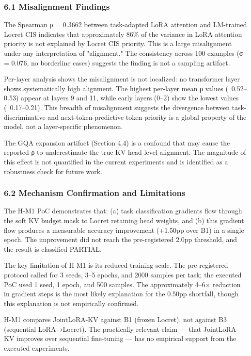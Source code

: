 
\subsubsection{6.1 Misalignment Findings}

The Spearman ρ = 0.3662 between task-adapted LoRA attention and LM-trained Locret CIS indicates that approximately 86\% of the variance in LoRA attention priority is not explained by Locret CIS priority. This is a large misalignment under any interpretation of "alignment." The consistency across 100 examples (σ = 0.076, no borderline cases) suggests the finding is not a sampling artifact.

Per-layer analysis shows the misalignment is not localized: no transformer layer shows systematically high alignment. The highest per-layer mean ρ values (~0.52–0.53) appear at layers 9 and 11, while early layers (0–2) show the lowest values (~0.17–0.21). This breadth of misalignment suggests the divergence between task-discriminative and next-token-predictive token priority is a global property of the model, not a layer-specific phenomenon.

The GQA expansion artifact (Section 4.4) is a confound that may cause the reported ρ to underestimate the true KV-head-level alignment. The magnitude of this effect is not quantified in the current experiments and is identified as a robustness check for future work.

\subsubsection{6.2 Mechanism Confirmation and Limitations}

The H-M1 PoC demonstrates that: (a) task classification gradients flow through the soft KV budget mask to Locret retaining head weights, and (b) this gradient flow produces a measurable accuracy improvement (+1.50pp over B1) in a single epoch. The improvement did not reach the pre-registered 2.0pp threshold, and the result is classified PARTIAL.

The key limitation of H-M1 is its reduced training scale. The pre-registered protocol called for 3 seeds, 3–5 epochs, and 2000 samples per task; the executed PoC used 1 seed, 1 epoch, and 500 samples. The approximately 4–6× reduction in gradient steps is the most likely explanation for the 0.50pp shortfall, though this explanation is not empirically confirmed.

H-M1 compares JointLoRA-KV against B1 (frozen Locret), not against B3 (sequential LoRA→Locret). The practically relevant claim — that JointLoRA-KV improves over sequential fine-tuning — has no empirical support from the executed experiments.

